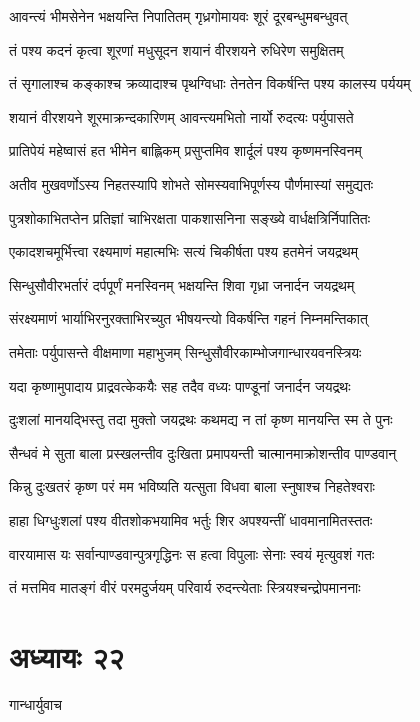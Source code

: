 \twolineshloka
{आवन्त्यं भीमसेनेन भक्षयन्ति निपातितम्}
{गृध्रगोमायवः शूरं दूरबन्धुमबन्धुवत्}


\twolineshloka
{तं पश्य कदनं कृत्वा शूरणां मधुसूदन}
{शयानं वीरशयने रुधिरेण समुक्षितम्}


\twolineshloka
{तं सृगालाश्च कङ्काश्च क्रव्यादाश्च पृथग्विधाः}
{तेनतेन विकर्षन्ति पश्य कालस्य पर्ययम्}


\twolineshloka
{शयानं वीरशयने शूरमाक्रन्दकारिणम्}
{आवन्त्यमभितो नार्यो रुदत्यः पर्युपासते}


\twolineshloka
{प्रातिपेयं महेष्वासं हत भीमेन बाह्लिकम्}
{प्रसुप्तमिव शार्दूलं पश्य कृष्णमनस्विनम्}


\twolineshloka
{अतीव मुखवर्णोऽस्य निहतस्यापि शोभते}
{सोमस्यवाभिपूर्णस्य पौर्णमास्यां समुद्यतः}


\twolineshloka
{पुत्रशोकाभितप्तेन प्रतिज्ञां चाभिरक्षता}
{पाकशासनिना सङ्ख्ये वार्धक्षत्रिर्निपातितः}


\twolineshloka
{एकादशचमूर्भित्त्वा रक्ष्यमाणं महात्मभिः}
{सत्यं चिकीर्षता पश्य हतमेनं जयद्रथम्}


\twolineshloka
{सिन्धुसौवीरभर्तारं दर्पपूर्णं मनस्विनम्}
{भक्षयन्ति शिवा गृध्रा जनार्दन जयद्रथम्}


\twolineshloka
{संरक्ष्यमाणं भार्याभिरनुरक्ताभिरच्युत}
{भीषयन्त्यो विकर्षन्ति गहनं निम्नमन्तिकात्}


\twolineshloka
{तमेताः पर्युपासन्ते वीक्षमाणा महाभुजम्}
{सिन्धुसौवीरकाम्भोजगान्धारयवनस्त्रियः}


\twolineshloka
{यदा कृष्णामुपादाय प्राद्रवत्केकयैः सह}
{तदैव वध्यः पाण्डूनां जनार्दन जयद्रथः}


\twolineshloka
{दुःशलां मानयद्भिस्तु तदा मुक्तो जयद्रथः}
{कथमद्य न तां कृष्ण मानयन्ति स्म ते पुनः}


\twolineshloka
{सैन्धवं मे सुता बाला प्रस्खलन्तीव दुःखिता}
{प्रमापयन्ती चात्मानमाक्रोशन्तीव पाण्डवान्}


\twolineshloka
{किन्नु दुःखतरं कृष्ण परं मम भविष्यति}
{यत्सुता विधवा बाला स्नुषाश्च निहतेश्वराः}


\twolineshloka
{हाहा धिग्धुःशलां पश्य वीतशोकभयामिव}
{भर्तुः शिर अपश्यन्तीं धावमानामितस्ततः}


\twolineshloka
{वारयामास यः सर्वान्पाण्डवान्पुत्रगृद्धिनः}
{स हत्वा विपुलाः सेनाः स्वयं मृत्युवशं गतः}


\twolineshloka
{तं मत्तमिव मातङ्गं वीरं परमदुर्जयम्}
{परिवार्य रुदन्त्येताः स्त्रियश्चन्द्रोपमाननाः}


\chapter{अध्यायः २२}
\twolineshloka
{गान्धार्युवाच}
{}


